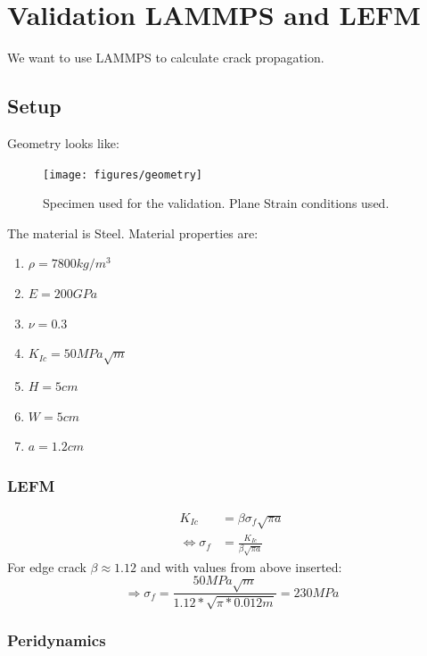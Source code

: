 \chapter{Validation LAMMPS and LEFM}
\label{ch:validation_lammps_lefm}

We want to use LAMMPS to calculate crack propagation.

\section{Setup}
Geometry looks like:
\begin{figure}[hbtp]
	\centering
\texttt{[image: figures/geometry]}
\label{fig:specimen}
\caption{Specimen used for the validation. Plane Strain conditions used.}
\end{figure}

The material is Steel. Material properties are:
\begin{enumerate}
	\item $\rho = 7800 kg/m^3$
	\item $E = 200 GPa$
	\item $\nu = 0.3$
	\item $K_{Ic}=50MPa\sqrt{m}$
	\item $H = 5cm$
	\item $W = 5cm$
	\item $a = 1.2cm$
\end{enumerate}

\subsection{LEFM}
\begin{align}
K_{Ic} &= \beta \sigma_f \sqrt{\pi a}\\
\Leftrightarrow \sigma_f &= \frac{K_{Ic}}{\beta \sqrt{\pi a}}
\end{align}
For edge crack $\beta \approx 1.12$ and with values from above inserted:
$$\Rightarrow \sigma_f = \frac{50MPa\sqrt{m}}{1.12*\sqrt{\pi*0.012m}}=230MPa$$



\subsection{Peridynamics}
